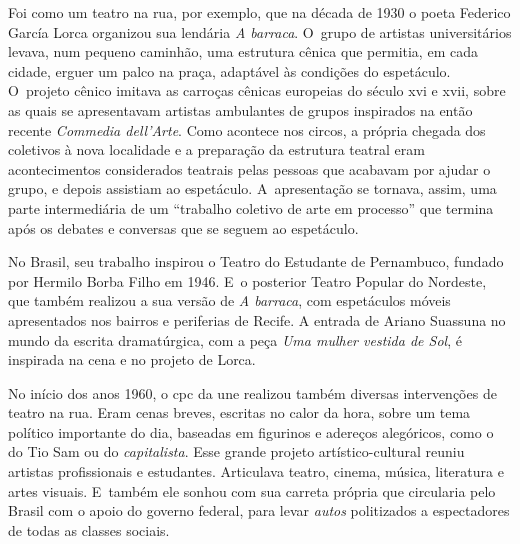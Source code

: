 Foi como um teatro na rua, por exemplo, que na década de 1930 o
poeta Federico García Lorca organizou sua lendária {\it A barraca}. O~grupo de
artistas universitários levava, num pequeno caminhão, uma estrutura
cênica que permitia, em cada cidade, erguer um palco na praça, adaptável
às condições do espetáculo. O~projeto cênico imitava as carroças cênicas
europeias do século {\sc xvi} e {\sc xvii}, sobre as quais se apresentavam artistas
ambulantes de grupos inspirados na então recente {\it Commedia
dell'Arte}. Como acontece nos circos, a própria chegada dos coletivos
à nova localidade e a preparação da estrutura teatral eram
acontecimentos considerados teatrais pelas pessoas que acabavam por
ajudar o grupo, e depois assistiam ao espetáculo. A~apresentação se
tornava, assim, uma parte intermediária de um “trabalho coletivo de arte
em processo” que termina após os debates e conversas que se seguem ao
espetáculo.


No Brasil, seu trabalho inspirou o Teatro do Estudante de Pernambuco,
fundado por Hermilo Borba Filho em 1946. E~o posterior Teatro Popular do
Nordeste, que também realizou a sua versão de {\it A barraca}, com
espetáculos móveis apresentados nos bairros e periferias de Recife. A
entrada de Ariano Suassuna no mundo da escrita dramatúrgica, com a peça
{\it Uma mulher vestida de Sol}, é inspirada na cena e no projeto de
Lorca.


No início dos anos 1960, o {\sc cpc} da {\sc une} realizou também diversas
intervenções de teatro na rua. Eram cenas breves, escritas no
calor da hora, sobre um tema político importante do dia, baseadas em
figurinos e adereços alegóricos, como o do Tio Sam ou do
{\it capitalista}. Esse grande projeto artístico-cultural reuniu
artistas profissionais e estudantes. Articulava teatro, cinema, música,
literatura e artes visuais. E~também ele sonhou com sua carreta própria
que circularia pelo Brasil com o apoio do governo federal, para levar
{\it autos} politizados a espectadores de todas as classes sociais.

